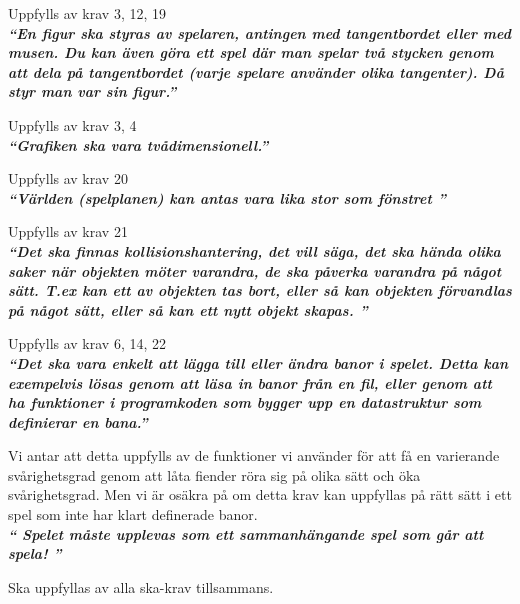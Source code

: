 \documentclass{TDP005mall}
\begin{document}
Uppfylls av krav 3, 12, 19\\

\textit{\textbf{``En figur ska styras av spelaren, antingen med tangentbordet eller med musen. Du kan även göra ett spel där man spelar två stycken genom att dela på tangentbordet (varje spelare använder olika tangenter). Då styr man var sin figur.''}}


Uppfylls av krav 3, 4\\

\textit{\textbf{``Grafiken ska vara tvådimensionell.''}}


Uppfylls av krav 20\\

\textit{\textbf{``Världen (spelplanen) kan antas vara lika stor som fönstret ''}}


Uppfylls av krav 21\\

\textit{\textbf{``Det ska finnas kollisionshantering, det vill säga, det ska hända olika saker när objekten möter varandra, de ska påverka varandra på något sätt. T.ex kan ett av objekten tas bort, eller så kan objekten förvandlas på något sätt, eller så kan ett nytt objekt skapas. ''}}


Uppfylls av krav 6, 14, 22\\

\textit{\textbf{``Det ska vara enkelt att lägga till eller ändra banor i spelet. Detta kan exempelvis lösas genom att läsa in banor från en fil, eller genom att ha funktioner i programkoden som bygger upp en datastruktur som definierar en bana.''}}


Vi antar att detta uppfylls av de funktioner vi använder för att få en varierande svårighetsgrad genom att låta fiender röra sig på olika sätt och öka svårighetsgrad. Men vi är osäkra på om detta krav kan uppfyllas på rätt sätt i ett spel som inte har klart definerade banor.\\

\textit{\textbf{`` Spelet måste upplevas som ett sammanhängande spel som går att spela! ''}}

Ska uppfyllas av alla ska-krav tillsammans.
\end{document}

